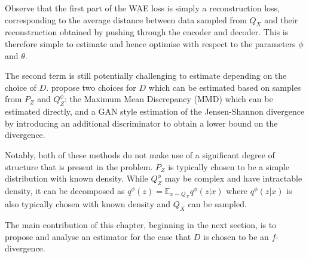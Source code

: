 
Observe that the first part of the WAE loss is simply a reconstruction loss, corresponding to the average distance between data sampled from $Q_X$ and their reconstruction obtained by pushing through the encoder and decoder.
This is therefore simple to estimate and hence optimise with respect to the parameters $\phi$ and $\theta$.

The second term is still potentially challenging to estimate depending on the choice of $D$. 
\cite{tolstikhin} propose two choices for $D$ which can be estimated based on samples from $P_Z$ and $Q_Z^\phi$: the Maximum Mean Discrepancy (MMD) \cite{gretton} which can be estimated directly, and a GAN style estimation of the Jensen-Shannon divergence by introducing an additional discriminator to obtain a lower bound on the divergence. 

Notably, both of these methods do not make use of a significant degree of structure that is present in the problem. $P_Z$ is typically chosen to be a simple distribution with known density. While $Q_Z^\phi$ may be complex and have intractable density, it can be decomposed as $q^\phi(z) = \mathbb{E}_{x\sim Q_X} q^\phi(z|x)$ where $q^\phi(z|x)$ is also typically chosen with known density and $Q_X$ can be sampled.

The main contribution of this chapter, beginning in the next section, is to propose and analyse an estimator for the case that $D$ is chosen to be an $f$-divergence. 








